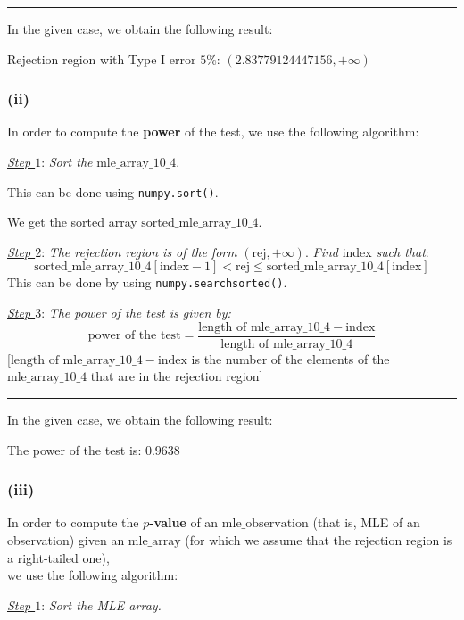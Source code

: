 \documentclass[11pt]{article}
\newcommand{\subsubsectionindent}{\hspace{15pt}}
\begin{document}
\rule{\textwidth / 2}{0.4pt}

In the given case, we obtain the following result:

    Rejection region with Type I error $5\%$: $( 2.83779124447156 , + \infty )$

\subsubsection*{\subsubsectionindent (ii)}

In order to compute the \textbf{power} of the test, we use the following algorithm:

\quad \textit{\underline{Step $1$}}: \textit{Sort the} $\text{mle\_array\_} 10 \_ 4$.

This can be done using \verb+numpy.sort()+.

We get the sorted array $\text{sorted\_mle\_array\_} 10 \_ 4$.

\quad \textit{\underline{Step $2$}}: \textit{The rejection region is of the form} $(\text{rej}, + \infty)$. \textit{Find} index \textit{such that}:
\[
\text{sorted\_mle\_array}\_10\_4 [\text{index} - 1] < \text{rej} \le \text{sorted\_mle\_array}\_10\_4 [\text{index}]
\]
This can be done by using \verb+numpy.searchsorted()+.

\quad \textit{\underline{Step $3$}}: \textit{The power of the test is given by:}
\[
\text{power of the test} = \frac{ \text{length of mle\_array\_} 10 \_ 4 - \text{index} }{ \text{length of mle\_array\_} 10 \_ 4 }
\]
[$\text{length of mle\_array\_} 10 \_ 4 - \text{index}$ is the number of the elements of the $\text{mle\_array\_} 10 \_ 4$ that are in the rejection region]

 
\rule{\textwidth / 2}{0.4pt}

In the given case, we obtain the following result:

    The power of the test is:  $0.9638$

\subsubsection*{\subsubsectionindent (iii)}

In order to compute the \textbf{$p$-value} of an $\text{mle\_observation}$ (that is, MLE of an observation) given an $\text{mle\_array}$ (for which we assume that the rejection region is a right-tailed one),
\\we use the following algorithm:

\quad \textit{\underline{Step $1$}}: \textit{Sort the MLE array.}
\end{document}
